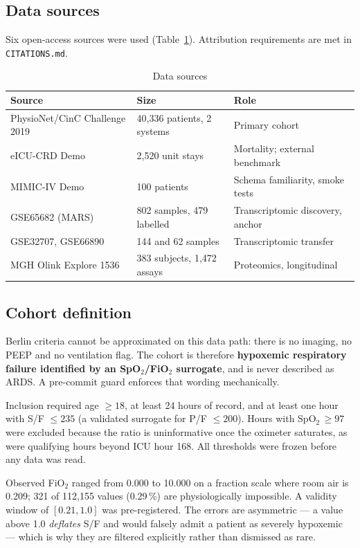 \documentclass[11pt,letterpaper]{article}
\newcommand{\Fio}{FiO$_2$}
\newcommand{\Spo}{SpO$_2$}
\begin{document}
\subsection{Data sources}

Six open-access sources were used (Table~\ref{tab:sources}). Attribution requirements are
met in \texttt{CITATIONS.md}.

\begin{table}[H]
\centering\small
\begin{tabular}{lll}
\toprule
Source & Size & Role \\
\midrule
PhysioNet/CinC Challenge 2019 & 40,336 patients, 2 systems & Primary cohort \\
eICU-CRD Demo & 2,520 unit stays & Mortality; external benchmark \\
MIMIC-IV Demo & 100 patients & Schema familiarity, smoke tests \\
GSE65682 (MARS) & 802 samples, 479 labelled & Transcriptomic discovery, anchor \\
GSE32707, GSE66890 & 144 and 62 samples & Transcriptomic transfer \\
MGH Olink Explore 1536 & 383 subjects, 1,472 assays & Proteomics, longitudinal \\
\bottomrule
\end{tabular}
\caption{Data sources}
\label{tab:sources}
\end{table}

\subsection{Cohort definition}

Berlin criteria cannot be approximated on this data path: there is no imaging, no PEEP and
no ventilation flag. The cohort is therefore \textbf{hypoxemic respiratory failure
identified by an \Spo/\Fio{} surrogate}, and is never described as ARDS. A pre-commit guard
enforces that wording mechanically.

Inclusion required age $\ge 18$, at least 24 hours of record, and at least one hour with
S/F $\le 235$ (a validated surrogate for P/F $\le 200$). Hours with \Spo$\,\ge 97$ were
excluded because the ratio is uninformative once the oximeter saturates, as were qualifying
hours beyond ICU hour 168. All thresholds were frozen before any data was read.

Observed \Fio{} ranged from 0.000 to 10.000 on a fraction scale where room air is 0.209;
321 of 112,155 values (0.29\,\%) are physiologically impossible. A validity window of
$[0.21, 1.0]$ was pre-registered. The errors are asymmetric --- a value above 1.0
\emph{deflates} S/F and would falsely admit a patient as severely hypoxemic --- which is why
they are filtered explicitly rather than dismissed as rare.
\end{document}
